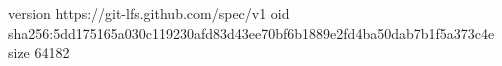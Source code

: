 version https://git-lfs.github.com/spec/v1
oid sha256:5dd175165a030c119230afd83d43ee70bf6b1889e2fd4ba50dab7b1f5a373c4e
size 64182
